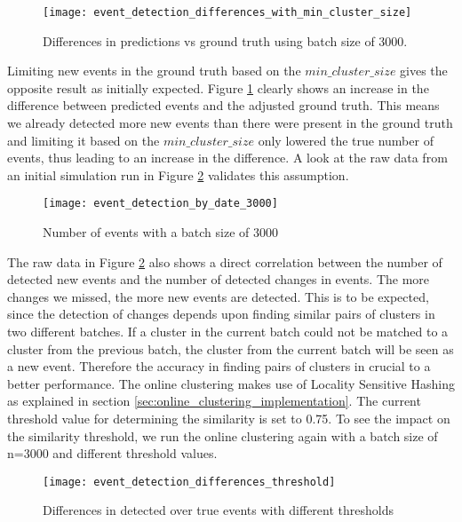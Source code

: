 \begin{figure}[h]
    \centering
    \texttt{[image: event\_detection\_differences\_with\_min\_cluster\_size]}
    \caption{Differences in predictions vs ground truth using batch size of 3000.}
    \label{fig:event_detection_differences_with_min_cluster_size}
\end{figure}

Limiting new events in the ground truth based on the $min\_cluster\_size$ gives the opposite result as initially expected. 
Figure \ref{fig:event_detection_differences_with_min_cluster_size} clearly shows an increase in the difference between predicted events and the adjusted ground truth. This means we already detected more new events than there were present in the ground truth and limiting it based on the $min\_cluster\_size$ only lowered the true number of events, thus leading to an increase in the difference. A look at the raw data from an initial simulation run in Figure \ref{fig:event_detection_by_date_3000} validates this assumption.

\begin{figure}[h]
    \centering
    \texttt{[image: event\_detection\_by\_date\_3000]}
    \caption{Number of events with a batch size of 3000}
    \label{fig:event_detection_by_date_3000}
\end{figure}

The raw data in Figure \ref{fig:event_detection_by_date_3000} also shows a direct correlation between the number of detected new events and the number of detected changes in events. The more changes we missed, the more new events are detected. This is to be expected, since the detection of changes depends upon finding similar pairs of clusters in two different batches. If a cluster in the current batch could not be matched to a cluster from the previous batch, the cluster from the current batch will be seen as a new event. Therefore the accuracy in finding pairs of clusters in crucial to a better performance. The online clustering makes use of Locality Sensitive Hashing as explained in section \ref{sec:online_clustering_implementation}. The current threshold value for determining the similarity is set to 0.75. To see the impact on the similarity threshold, we run the online clustering again with a batch size of n=3000 and different threshold values.

\begin{figure}[h]
    \centering
    \texttt{[image: event\_detection\_differences\_threshold]}
    \caption{Differences in detected over true events with different thresholds}
    \label{fig:event_detection_differences_threshold}
\end{figure}

